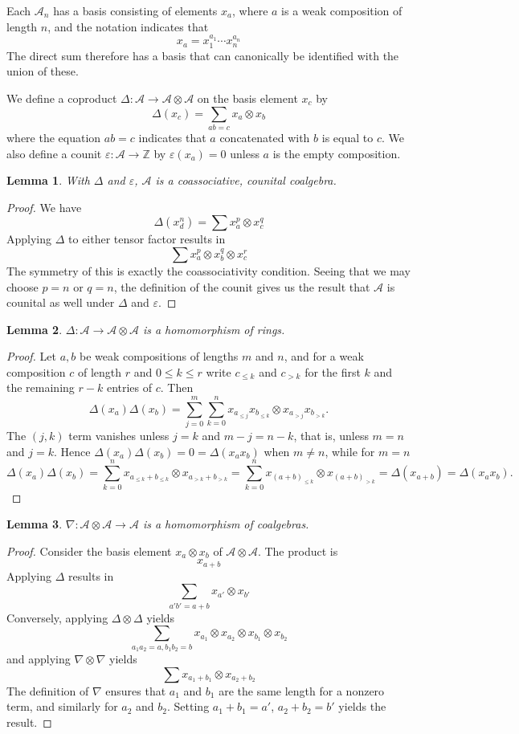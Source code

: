 \documentclass{amsart}
\newtheorem{lemma}{Lemma}[subsection]
\theoremstyle{definition}
\theoremstyle{remark}
\numberwithin{equation}{subsection}
\newcommand{\coma}{\mathcal{A}}
\begin{document}
Each $\coma_n$ has a basis consisting of elements $x_a$, where $a$ is a weak composition of length $n$, and the notation indicates that
$$x_a = x_1^{a_1}\cdots x_n^{a_n}$$
The direct sum therefore has a basis that can canonically be identified with the union of these.

We define a coproduct $\Delta:\coma\to\coma\otimes\coma$ on the basis element $x_c$ by
$$\Delta(x_c) = \sum_{ab=c} x_a\otimes x_b$$
where the equation $ab=c$ indicates that $a$ concatenated with $b$ is equal to $c$. We also define a counit $\varepsilon:\coma\to \mathbb{Z}$ by $\varepsilon(x_a)=0$ unless $a$ is the empty composition.

\begin{lemma}
	With $\Delta$ and $\varepsilon$, $\coma$ is a coassociative, counital coalgebra.
\end{lemma}
\begin{proof}
	We have 
	$$\Delta(x_d^n)=\sum x_a^p\otimes x_c^q$$
	Applying $\Delta$ to either tensor factor results in
	$$\sum x_a^p\otimes x_b^q\otimes x_c^r$$
	The symmetry of this is exactly the coassociativity condition. Seeing that we may choose $p=n$ or $q=n$, the definition of the counit gives us the result that $\coma$ is counital as well under $\Delta$ and $\varepsilon$.
\end{proof}

\begin{lemma}
	$\Delta:\coma\to\coma\otimes\coma$ is a homomorphism of rings.
\end{lemma}
\begin{proof}
Let $a,b$ be weak compositions of lengths $m$ and $n$, and for a weak composition $c$ of length $r$ and $0\leq k\leq r$ write $c_{\leq k}$ and $c_{>k}$ for the first $k$ and the remaining $r-k$ entries of $c$. Then
$$\Delta(x_a)\Delta(x_b)=\sum_{j=0}^{m}\sum_{k=0}^{n}x_{a_{\leq j}}x_{b_{\leq k}}\otimes x_{a_{>j}}x_{b_{>k}}\text{.}$$
The $(j,k)$ term vanishes unless $j=k$ and $m-j=n-k$, that is, unless $m=n$ and $j=k$. Hence $\Delta(x_a)\Delta(x_b)=0=\Delta(x_ax_b)$ when $m\neq n$, while for $m=n$
$$\Delta(x_a)\Delta(x_b)=\sum_{k=0}^n x_{a_{\leq k}+b_{\leq k}}\otimes x_{a_{>k}+b_{>k}}=\sum_{k=0}^n x_{(a+b)_{\leq k}}\otimes x_{(a+b)_{>k}}=\Delta(x_{a+b})=\Delta(x_ax_b)\text{.}$$
\end{proof}

\begin{lemma}
	$\nabla:\coma\otimes \coma\to \coma$ is a homomorphism of coalgebras.
\end{lemma}
\begin{proof}
  Consider the basis element $x_a\otimes x_b$ of $\coma\otimes \coma$. The product is
  $$x_{a+b}$$
  Applying $\Delta$ results in
$$\sum_{a'b'=a+b} x_{a'}\otimes x_{b'}$$
Conversely, applying $\Delta\otimes \Delta$ yields
$$\sum_{a_1a_2=a,b_1b_2=b}x_{a_1}\otimes x_{a_2}\otimes x_{b_1}\otimes x_{b_2}$$
and applying $\nabla\otimes \nabla$ yields
$$\sum x_{a_1 + b_1}\otimes x_{a_2 + b_2}$$
The definition of $\nabla$ ensures that $a_1$ and $b_1$ are the same length for a nonzero term, and similarly for $a_2$ and $b_2$. Setting $a_1+b_1=a'$, $a_2+b_2=b'$ yields the result.
\end{proof}
\end{document}
